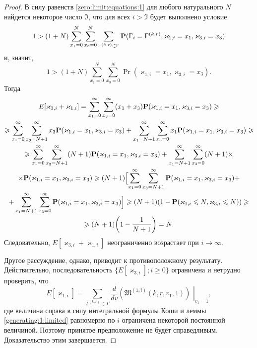 \begin{proof}
В силу равенств \eqref{zero:limit:equations:1} для любого натурального $N$ найдется некоторое число $\mathfrak{I}$,  что для всех $i > \mathfrak{I}$ будет выполнено условие
$$1 > (1+N) \sum_{x_1=0}^{N}\sum_{x_3=0}^{N} \sum_{\Gamma^{(k, r)}\in \Gamma}  \Pr(\Gamma_{i}=\Gamma^{(k, r)},  \varkappa_{1, i} \hm{} = x_1,  \varkappa_{3, i}=x_3)$$
и,  значит,  
$$1 >(1+N) \sum_{x_1=0}^{N}\sum_{x_3=0}^{N} \Pr(\varkappa_{1, i} = x_1,  \varkappa_{3, i}=x_3)
.$$
Тогда
\begin{multline*}
E[\varkappa_{3, i}+\varkappa_{1, i}] = \sum_{x_1=0}^{\infty}\sum_{x_3=0}^{\infty} (x_1 + x_3) \Pr(\varkappa_{1, i} = x_1,  \varkappa_{3, i}=x_3) \geqslant \\
\geqslant
 \sum_{x_1=0}^{\infty}\sum_{x_3=N+1}^{\infty} x_3 \Pr(\varkappa_{1, i} = x_1,  \varkappa_{3, i}=x_3) +  \sum_{x_1=N+1}^{\infty}\sum_{x_3=0}^{\infty} x_1 \Pr(\varkappa_{1, i} = x_1,  \varkappa_{3, i}=x_3) \geqslant \\
 \geqslant
  \sum_{x_1=0}^{\infty}\sum_{x_3=N+1}^{\infty} (N+1) \Pr(\varkappa_{1, i} = x_1,  \varkappa_{3, i}=x_3) + \sum_{x_1=N+1}^{\infty}\sum_{x_3=0}^{\infty} (N+1) \times \\ \times \Pr(\varkappa_{1, i} = x_1,  \varkappa_{3, i}=x_3)
  \geqslant
  (N+1)\Bigl[\sum_{x_1=0}^{\infty}\sum_{x_3=N+1}^{\infty} \Pr(\varkappa_{1, i} = x_1,  \varkappa_{3, i}=x_3) + \\+ \sum_{x_1=N+1}^{\infty}\sum_{x_3=0}^{\infty}\Pr(\varkappa_{1, i} = x_1,  \varkappa_{3, i}=x_3)\Bigr] 
  \geqslant (N+1)(1-\Pr(\varkappa_{1, i} \leqslant N,  \varkappa_{3, i} \leqslant N)  ) 
  \geqslant \\ \geqslant
  (N+1)\biggl(1-\frac{1}{N+1}\biggr) = N.
\end{multline*}
Следовательно,  $E[\varkappa_{3, i}+\varkappa_{1, i}]$ неограниченно возрастает при $i \to \infty$. 

Другое рассуждение,  однако,  приводит к противоположному результату. Действительно,  последовательность $\{E[\varkappa_{3, i}]; i \geqslant 0\}$ ограничена  и нетрудно проверить,  что
$$
E[\varkappa_{1, i}] =\sum_{\Gamma^{(k, r)}\in \Gamma} \frac{d}{dv}\left.\left(\mathfrak{M}^{(1, i)}(k, r, v_1, 1)\right)\,\,\right|_{v_1=1}, 
$$
где величина справа в силу интегральной формулы Коши и леммы \ref{generating:1:limited} равномерно по $i$ ограничена некоторой постоянной величиной. 
 Поэтому принятое предположение не будет справедливым. Доказательство этим завершается.
\end{proof}


